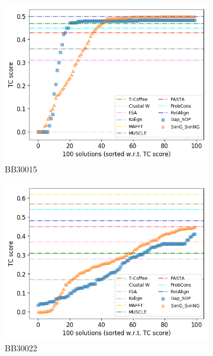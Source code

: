 \begin{figure}[!htbp]
\begin{adjustwidth}{-1cm}{-1cm}
\begin{subfigure}{0.22\textwidth}
		\end{subfigure}
		\begin{subfigure}{0.22\textwidth}
			\includegraphics[width=\columnwidth]{Figure/summary/precomputedInit/Balibase/BB30015_tc_density_single_run_2}
			\caption{BB30015}
		\end{subfigure}
		\begin{subfigure}{0.22\textwidth}
			\includegraphics[width=\columnwidth]{Figure/summary/precomputedInit/Balibase/BB30022_tc_density_single_run_2}
			\caption{BB30022}
		\end{subfigure}
		\begin{subfigure}{0.22\textwidth}

\end{subfigure}
\end{adjustwidth}
\end{figure}
